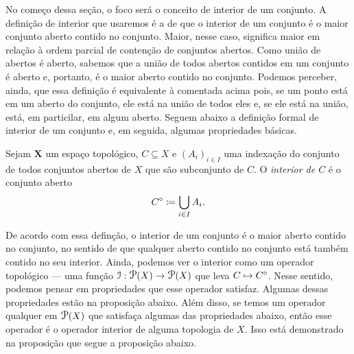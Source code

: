	No começo dessa seção, o foco será o conceito de interior de um conjunto. A definição de interior que usaremos é a de que o interior de um conjunto é o maior conjunto aberto contido no conjunto. Maior, nesse caso, significa maior em relação à ordem parcial de contenção de conjuntos abertos. Como união de abertos é aberto, sabemos que a união de todos abertos contidos em um conjunto é aberto e, portanto, é o maior aberto contido no conjunto. Podemos perceber, ainda, que essa definição é equivalente à comentada acima pois, se um ponto está em um aberto do conjunto, ele está na união de todos eles e, se ele está na união, está, em particilar, em algum aberto. Seguem abaixo a definição formal de interior de um conjunto e, em seguida, algumas propriedades básicas.

\begin{defi}
	Sejam $\bm X$ um espaço topológico, $C \subseteq X$ e $(A_i)_{i \in I}$ uma indexação do conjunto de todos conjuntos abertos de $X$ que são subconjunto de $C$. O \emph{interior de $C$} é o conjunto aberto
	\begin{equation*}
	\inn{C} \coloneqq \bigcup_{i \in I} A_i.
	\end{equation*}
\end{defi}

	De acordo com essa definção, o interior de um conjunto é o maior aberto contido no conjunto, no sentido de que qualquer aberto contido no conjunto está também contido no seu interior. Ainda, podemos ver o interior como um operador topológico \---- uma função $\mathcal I: \p(X) \to \p(X)$ que leva $C \mapsto {C}^\circ$. Nesse sentido, podemos pensar em propriedades que esse operador satisfaz. Algumas dessas propriedades estão na proposição abaixo. Além disso, se temos um operador qualquer em $\p(X)$ que satisfaça algumas das propriedades abaixo, então esse operador é o operador interior de alguma topologia de $X$. Isso está demonstrado na proposição que segue a proposição abaixo.


